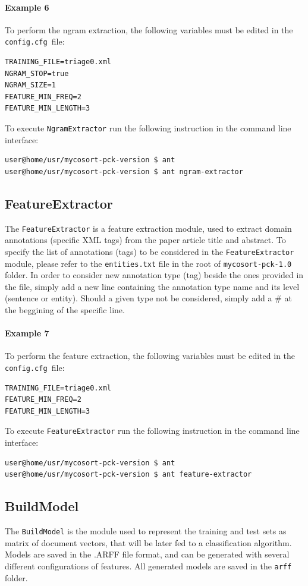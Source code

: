 \documentclass[11pt]{article}
\newcommand{\homefolder}{\texttt{mycosort-pck-\version{ }}}
\newcommand{\configfile}{\texttt{config.cfg{ }}}
\def\version{{\tt 1.0}}
\begin{document}
\paragraph{Example 6}
To perform the ngram extraction, the following variables must be edited in the \configfile file:
\begin{lstlisting}
TRAINING_FILE=triage0.xml
NGRAM_STOP=true
NGRAM_SIZE=1
FEATURE_MIN_FREQ=2
FEATURE_MIN_LENGTH=3
\end{lstlisting}
To execute \texttt{NgramExtractor} run the following instruction in the command line interface:
\begin{lstlisting}
user@home/usr/mycosort-pck-version $ ant
user@home/usr/mycosort-pck-version $ ant ngram-extractor
\end{lstlisting}

\subsection{FeatureExtractor}
The \texttt{FeatureExtractor} is a feature extraction module, used to extract domain annotations 
(specific XML tags) from the paper article title and abstract.
To specify the list of annotations (tags) to be considered in the \texttt{FeatureExtractor} module,
please refer to the \texttt{entities.txt} file in the root of \homefolder folder.
In order to consider new annotation type (tag) beside the ones provided in the file, 
simply add a new line containing the annotation type name and its level (sentence or entity).
Should a given type not be considered, simply add a \# at the beggining of the specific line.

\paragraph{Example 7}
To perform the feature extraction, the following variables must be edited in the \configfile file:
\begin{lstlisting}
TRAINING_FILE=triage0.xml
FEATURE_MIN_FREQ=2
FEATURE_MIN_LENGTH=3
\end{lstlisting}
To execute \texttt{FeatureExtractor} run the following instruction in the command line interface:
\begin{lstlisting}
user@home/usr/mycosort-pck-version $ ant
user@home/usr/mycosort-pck-version $ ant feature-extractor
\end{lstlisting}


\subsection{BuildModel}
The \texttt{BuildModel} is the module used to represent the training and test sets as
matrix of document vectors, that will be later fed to a classification algorithm.
Models are saved in the .ARFF file format, and can be generated with several different configurations of features.
All generated models are saved in the \texttt{arff} folder.
\end{document}
